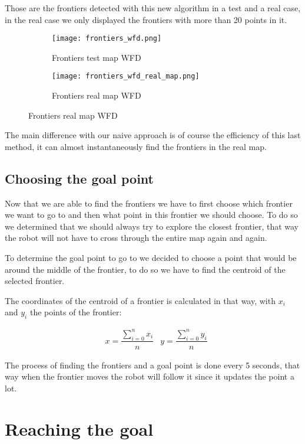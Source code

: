 Those are the frontiers detected with this new algorithm in a test and a real case, in the real case we only displayed the frontiers with more than 20 points in it.

\begin{figure}[h]
    \centering
    \begin{subfigure}{.5\textwidth}
        \centering
        \texttt{[image: frontiers\_wfd.png]}
        \caption{Frontiers test map WFD}
        \label{fig:frontiers_wfd}
    \end{subfigure}%
    \begin{subfigure}{.5\textwidth}
        \centering
        \texttt{[image: frontiers\_wfd\_real\_map.png]}
        \caption{Frontiers real map WFD}
        \label{fig:frontiers_wfd_real_map}
    \end{subfigure}
\end{figure}

The main difference with our naive approach is of course the efficiency of this last method, it can almost instantaneously find the frontiers in the real map.

\subsection{Choosing the goal point}

Now that we are able to find the frontiers we have to first choose which frontier we want to go to and then what point in this frontier we should choose.
To do so we determined that we should always try to explore the closest frontier, that way the robot will not have to cross through the entire map again and again.

To determine the goal point to go to we decided to choose a point that would be around the middle of the frontier, to do so we have to find the centroid of the selected frontier.

The coordinates of the centroid of a frontier is calculated in that way, with $x_i$ and $y_i$ the points of the frontier:

\begin{align*}
    &x = \dfrac{\sum_{i=0}^{n}x_i}{n}   &y = \dfrac{\sum_{i=0}^{n}y_i}{n}
\end{align*}

The process of finding the frontiers and a goal point is done every 5 seconds, that way when the frontier moves the robot will follow it since it updates the point a lot.

\section{Reaching the goal}

